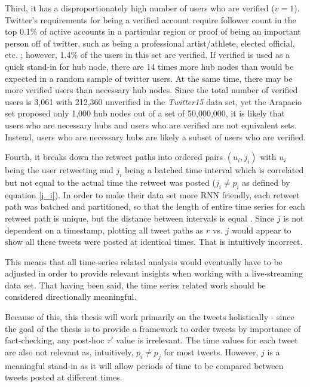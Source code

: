 \documentclass[NETN,manuscript]{stjour-new}
\begin{document}
Third, it has a disproportionately high number of users who are verified ($v = 1$). Twitter's requirements for being a verified account require follower count in the top 0.1\% of active accounts in a particular region or proof of being an important person off of twitter, such as being a professional artist/athlete, elected official, etc. \citep{twitter2020verified}; however, 1.4\% of the users in this set are verified. If verified is used as a quick stand-in for hub node, there are 14 times more hub nodes than would be expected in a random sample of twitter users. At the same time, there may be more verified users than necessary hub nodes. Since the total number of verified users is 3,061 with 212,360 unverified in the \textit{Twitter15} data set, yet the Arapacio set proposed only 1,000 hub nodes out of a set of 50,000,000, it is likely that users who are necessary hubs and users who are verified are not equivalent sets. Instead, users who are necessary hubs are likely a subset of users who are verified. 

Fourth, it breaks down the retweet paths into ordered pairs $(u_i,j_i)$ with $u_i$ being the user retweeting and $j_i$ being a batched time interval which is correlated but not equal to the actual time the retweet was posted ($j_i \neq p_i$ as defined by equation \ref{j_i}). In order to make their data set more RNN friendly, each retweet path was batched and partitioned, so that the length of entire time series for each retweet path is unique, but the distance between intervals is equal \citep{shu2017fake}. Since $j$ is not dependent on a timestamp, plotting all tweet paths as $r$ vs. $j$ would appear to show all these tweets were posted at identical times. That is intuitively incorrect. 

This means that all time-series related analysis would eventually have to be adjusted in order to provide relevant insights when working with a live-streaming data set. That having been said, the time series related work should be considered directionally meaningful.

Because of this, this thesis will work primarily on the tweets holistically - since the goal of the thesis is to provide a framework to order tweets by importance of fact-checking, any post-hoc $\tau'$ value is irrelevant. The time values for each tweet are also not relevant as, intuitively, $p_i \neq p_j$ for most tweets. However, $j$ is a meaningful stand-in as it will allow periods of time to be compared between tweets posted at different times. 
\end{document}
